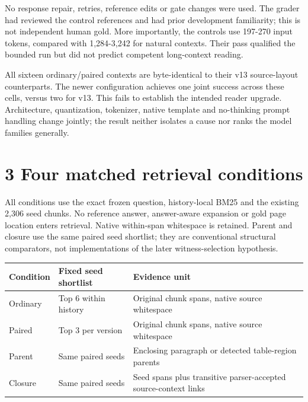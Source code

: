 \documentclass[11pt]{article}
\begin{document}
No response repair, retries, reference edits or gate changes were used. The grader had reviewed the control references and had prior development familiarity; this is not independent human gold. More importantly, the controls use 197-270 input tokens, compared with 1,284-3,242 for natural contexts. Their pass qualified the bounded run but did not predict competent long-context reading.


All sixteen ordinary/paired contexts are byte-identical to their v13 source-layout counterparts. The newer configuration achieves one joint success across these cells, versus two for v13. This fails to establish the intended reader upgrade. Architecture, quantization, tokenizer, native template and no-thinking prompt handling change jointly; the result neither isolates a cause nor ranks the model families generally.


\section*{3  Four matched retrieval conditions}

All conditions use the exact frozen question, history-local BM25 and the existing 2,306 seed chunks. No reference answer, answer-aware expansion or gold page location enters retrieval. Native within-span whitespace is retained. Parent and closure use the same paired seed shortlist; they are conventional structural comparators, not implementations of the later witness-selection hypothesis.


{\small

\begin{longtable}{>{\raggedright\arraybackslash}p{}>{\raggedright\arraybackslash}p{}>{\raggedright\arraybackslash}p{}}

\toprule

\textbf{Condition} & \textbf{Fixed seed shortlist} & \textbf{Evidence unit} \\

\midrule\endhead

Ordinary & Top 6 within history & Original chunk spans, native source whitespace \\

Paired & Top 3 per version & Original chunk spans, native source whitespace \\

Parent & Same paired seeds & Enclosing paragraph or detected table-region parents \\

Closure & Same paired seeds & Seed spans plus transitive parser-accepted source-context links \\

\bottomrule

\end{longtable}

}
\end{document}
